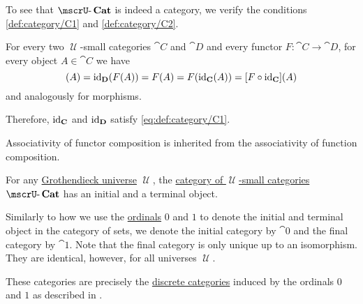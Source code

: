 \begin{defproof}
  To see that \( \ucat{Cat} \) is indeed a category, we verify the conditions \ref{def:category/C1} and \ref{def:category/C2}.

   For every two \( \mscrU \)-small categories \( \cat{C} \) and \( \cat{D} \) and every functor \( F: \cat{C} \to \cat{D} \), for every object \( A \in \cat{C} \) we have
  \begin{equation*}
    [\id_{\cat{D}} \bincirc F](A)
    =
    \id_{\cat{D}}(F(A))
    =
    F(A)
    =
    F(\id_{\cat{C}}(A))
    =
    [F \bincirc \id_{\cat{C}}](A)
  \end{equation*}
  and analogously for morphisms.

  Therefore, \( \id_{\cat{C}} \) and \( \id_{\cat{D}} \) satisfy \eqref{eq:def:category/C1}.

   Associativity of functor composition is inherited from the associativity of function composition.
\end{defproof}

\begin{definition}\label{def:universal_categories}
  For any \hyperref[def:grothendieck_universe]{Grothendieck universe} \( \mscrU \), the \hyperref[def:category_of_small_categories]{category of \( \mscrU \)-small categories} \( \ucat{Cat} \) has an initial and a terminal object.

  Similarly to how we use the \hyperref[def:ordinal]{ordinals} \( 0 \) and \( 1 \) to denote the initial and terminal object in the category of sets, we denote the initial category by \( \cat{0} \) and the final category by \( \cat{1} \). Note that the final category is only unique up to an isomorphism. They are identical, however, for all universes \( \mscrU \).

  These categories are precisely the \hyperref[def:discrete_category]{discrete categories} induced by the ordinals \( 0 \) and \( 1 \) as described in .
\end{definition}

